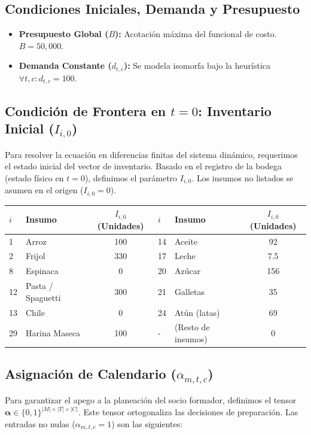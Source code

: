 \documentclass[12pt, a4paper]{article}
\begin{document}
\subsection{Condiciones Iniciales, Demanda y Presupuesto}
\begin{itemize}
    \item \textbf{Presupuesto Global ($B$):} Acotación máxima del funcional de costo. $B = 50,000$.
    \item \textbf{Demanda Constante ($d_{t,c}$):} Se modela isomorfa bajo la heurística $\forall t, c: d_{t,c} = 100$.
\end{itemize}

\subsection{Condición de Frontera en $t=0$: Inventario Inicial ($I_{i,0}$)}
Para resolver la ecuación en diferencias finitas del sistema dinámico, requerimos el estado inicial del vector de inventario. Basado en el registro de la bodega (estado físico en $t=0$), definimos el parámetro $I_{i,0}$. Los insumos no listados se asumen en el origen ($I_{i,0} = 0$).

\begin{longtable}{llc|llc}
\toprule
$i$ & \textbf{Insumo} & $I_{i,0}$ (Unidades) & $i$ & \textbf{Insumo} & $I_{i,0}$ (Unidades) \\
\midrule
1  & Arroz & 100 & 14 & Aceite & 92 \\
2  & Frijol & 330 & 17 & Leche & 7.5 \\
8  & Espinaca & 0 & 20 & Azúcar & 156 \\
12 & Pasta / Spaguetti & 300 & 21 & Galletas & 35 \\
13 & Chile & 0 & 24 & Atún (latas) & 69 \\
29 & Harina Maseca & 100 & - & (Resto de insumos) & 0 \\
\bottomrule
\end{longtable}

\subsection{ Asignación de Calendario ($\alpha_{m,t,c}$)}
Para garantizar el apego a la planeación del socio formador, definimos el tensor $\boldsymbol{\alpha} \in \{0,1\}^{|M| \times |T| \times |C|}$. Este tensor ortogonaliza las decisiones de preparación. Las entradas no nulas ($\alpha_{m,t,c} = 1$) son las siguientes:
\end{document}
